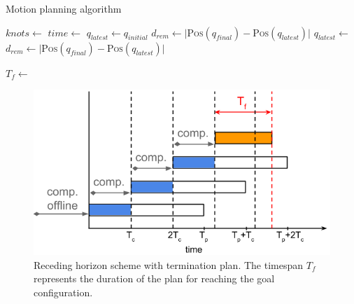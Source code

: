 \documentclass[eprint]{actapoly}
\begin{document}
\begin{algorithm}
    \caption{Motion planning algorithm\label{cod:algo}}
    \label{swpa}
    \begin{algorithmic}[1] %
	    \State $knots \gets $
	    \State $time \gets $
	    \State $q_{latest} \gets q_{initial}$
	    \State $d_{rem} \gets |${\scshape Pos}$(q_{final}) - ${\scshape Pos}$(q_{latest})|$
		\State $q_{latest} \gets $
		\State $d_{rem} \gets |${\scshape Pos}$(q_{final}) - ${\scshape Pos}$(q_{latest})|$
		
	    \EndWhile\label{planningwhile}
	    \State $T_f \gets $
	    
        \EndProcedure
    \end{algorithmic}
\end{algorithm}

\begin{figure}[!h]
  \centering
  \includegraphics[width=\linewidth]{./images/recedinghorizon.png} %
  \caption{Receding horizon scheme with termination plan. The timespan $T_f$ represents the duration of the plan for reaching the goal configuration.\label{fig:recedinghor}}
\end{figure}
\end{document}
